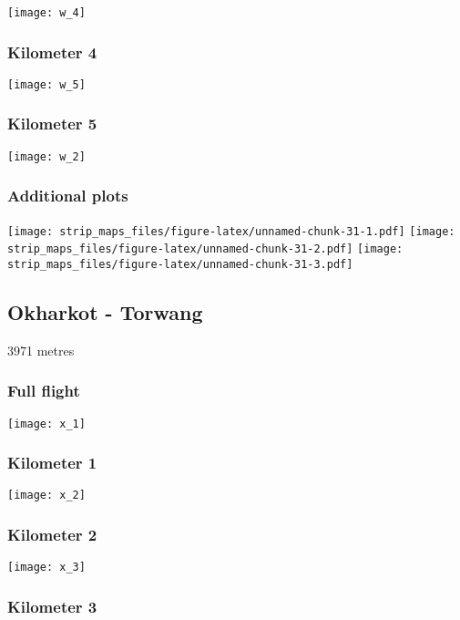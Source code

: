 \documentclass[]{article}
\begin{document}
\texttt{[image: w\_4]}

\subsubsection{Kilometer 4}\label{kilometer-4-21}

\texttt{[image: w\_5]}

\subsubsection{Kilometer 5}\label{kilometer-5-19}

\texttt{[image: w\_2]}

\subsubsection{Additional plots}\label{additional-plots-22}

\texttt{[image: strip\_maps\_files/figure-latex/unnamed-chunk-31-1.pdf]}
\texttt{[image: strip\_maps\_files/figure-latex/unnamed-chunk-31-2.pdf]}
\texttt{[image: strip\_maps\_files/figure-latex/unnamed-chunk-31-3.pdf]}

\newpage

\subsection{Okharkot - Torwang}\label{okharkot---torwang}

3971 metres

\subsubsection{Full flight}\label{full-flight-23}

\texttt{[image: x\_1]}

\subsubsection{Kilometer 1}\label{kilometer-1-23}

\texttt{[image: x\_2]}

\subsubsection{Kilometer 2}\label{kilometer-2-23}

\texttt{[image: x\_3]}

\subsubsection{Kilometer 3}\label{kilometer-3-23}
\end{document}
